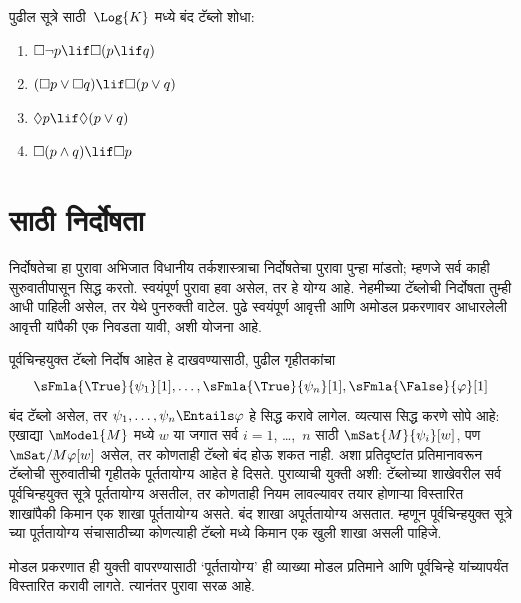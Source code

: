 \begin{prob}
  पुढील सूत्रे साठी~$\Log{K}$ मध्ये बंद
  टॅब्लो शोधा:
  \begin{enumerate}
    \item $\Box \lnot p \lif \Box(p \lif q)$
    \item $(\Box p \lor \Box q) \lif \Box(p \lor q)$
    \item $\Diamond p \lif \Diamond(p \lor q)$
    \item $\Box(p \land q) \lif \Box p$
  \end{enumerate}
\end{prob}
\section{ साठी निर्दोषता}\label{nml:tab:sou:sec}
\begin{editorial}
  निर्दोषतेचा हा पुरावा अभिजात विधानीय तर्कशास्त्राचा
  निर्दोषतेचा पुरावा पुन्हा मांडतो; म्हणजे सर्व काही
  सुरुवातीपासून सिद्ध करतो. स्वयंपूर्ण पुरावा हवा
  असेल, तर हे योग्य आहे. नेहमीच्या टॅब्लोची निर्दोषता
  तुम्ही आधी पाहिली असेल, तर येथे पुनरुक्ती वाटेल.
  पुढे स्वयंपूर्ण आवृत्ती आणि अमोडल प्रकरणावर आधारलेली
  आवृत्ती यांपैकी एक निवडता यावी, अशी योजना आहे.
\end{editorial}
\begin{explain}
  पूर्वचिन्हयुक्त टॅब्लो निर्दोष आहेत हे
  दाखवण्यासाठी, पुढील गृहीतकांचा
  \[
  \sFmla{\True}{\psi_1}[1], \dots, \sFmla{\True}{\psi_n}[1], \sFmla{\False}{\varphi}[1]
  \]
  बंद टॅब्लो असेल, तर $\psi_1, \dots, \psi_n
  \Entails \varphi$ हे सिद्ध करावे लागेल. व्यत्यास सिद्ध
  करणे सोपे आहे: एखाद्या $\mModel{M}$ मध्ये
  $w$ या जगात सर्व $i=1$, \dots,~$n$ साठी
  $\mSat{M}{\psi_i}[w]$, पण $\mSat/{M}{\varphi}[w]$
  असेल, तर कोणताही टॅब्लो बंद होऊ शकत नाही.
  अशा प्रतिदृष्टांत प्रतिमानावरून टॅब्लोची सुरुवातीची
  गृहीतके पूर्ततायोग्य आहेत हे दिसते. पुराव्याची युक्ती
  अशी: टॅब्लोच्या शाखेवरील सर्व
  पूर्वचिन्हयुक्त सूत्रे पूर्ततायोग्य असतील, तर
  कोणताही नियम लावल्यावर तयार होणाऱ्या विस्तारित
  शाखांपैकी किमान एक शाखा पूर्ततायोग्य असते. बंद शाखा
  अपूर्ततायोग्य असतात. म्हणून पूर्वचिन्हयुक्त सूत्रे
  च्या पूर्ततायोग्य संचासाठीच्या कोणत्याही टॅब्लो
  मध्ये किमान एक खुली शाखा असली पाहिजे.

  मोडल प्रकरणात ही युक्ती वापरण्यासाठी ‘पूर्ततायोग्य’
  ही व्याख्या मोडल प्रतिमाने आणि पूर्वचिन्हे यांच्यापर्यंत
  विस्तारित करावी लागते. त्यानंतर पुरावा सरळ आहे.
\end{explain}

